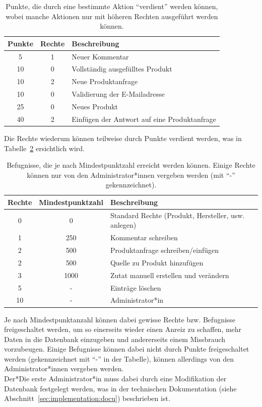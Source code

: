 \begin{table}[ht]
	\begin{tabular}{c|c|l}
		\rowcolor{gray!50}
		Punkte & Rechte & Beschreibung\\
			\hline
		5 & 1 & Neuer Kommentar\\
		10 & 0 & Vollständig ausgefülltes Produkt\\
		10 & 2 & Neue Produktanfrage\\
		10 & 0 & Validierung der E-Mailadresse\\
		25 & 0 & Neues Produkt\\
		40 & 2 & Einfügen der Antwort auf eine Produktanfrage\\
	\end{tabular}
	\caption{Punkte, die durch eine bestimmte Aktion
	"`verdient"' werden können, wobei manche Aktionen nur mit höheren 
Rechten ausgeführt werden können.}
	\label{table:points}
\end{table}

Die Rechte wiederum können teilweise durch Punkte verdient werden, was in 
Tabelle~\ref{table:permissions} ersichtlich wird.
\begin{table}[ht]
	\begin{tabular}{c|c|l}
		\rowcolor{gray!50}
		Rechte & Mindestpunktzahl & Beschreibung\\
			\hline
			0 & 0 & Standard Rechte (Produkt, Hersteller, usw. 
anlegen)\\
			1 & 250 & Kommentar schreiben\\
			2 & 500 & Produktanfrage schreiben/einfügen\\
			2 & 500 & Quelle zu Produkt hinzufügen\\
			3 & 1000 & Zutat manuell erstellen und verändern\\
			5 & - & Einträge löschen\\
			10 & - & Administrator*in
	\end{tabular}
	\caption{Befugnisse, die je nach Mindestpunktzahl erreicht 
werden
	können. Einige Rechte können nur von den Administrator*innen
	vergeben werden (mit "`-"' gekennzeichnet).}
	\label{table:permissions}
\end{table}
Je nach Mindestpunktanzahl können dabei gewisse Rechte bzw. Befugnisse
freigeschaltet werden, um so einerseits wieder einen Anreiz zu
schaffen, mehr Daten in die Datenbank einzugeben und andererseits
einem Missbrauch vorzubeugen.
Einige Befugnisse können dabei
nicht durch Punkte freigeschaltet werden (gekennzeichnet mit "`-"' in der 
Tabelle), können allerdings von den
Administrator*innen vergeben werden.\\
Der*Die erste Administrator*in muss dabei durch eine Modifikation der Datenbank 
festgelegt werden, was in der technischen Dokumentation (siehe 
Abschnitt~\ref{sec:implementation:docu}) beschrieben ist.

